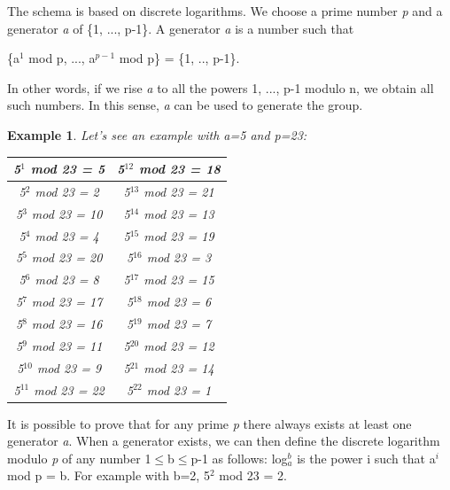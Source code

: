\documentclass[a4paper, 12pt]{report}
\newtheorem{example}{\textbf{Example}}
\begin{document}
The schema is based on discrete logarithms. We choose a prime number \textit{p} and a generator \textit{a} of \{1, ..., p-1\}. A generator \textit{a} is a number such that
\begin{center}
	\{a$^1$ mod p, ..., a$^{p-1}$ mod p\} = \{1, .., p-1\}.
\end{center} 
In other words, if we rise \textit{a} to all the powers 1, ..., p-1 modulo n, we obtain all such numbers. In this sense, \textit{a} can be used to generate the group.
\begin{example}
	Let's see an example with a=5 and p=23:
	\begin{table}[H]
		\centering
		\begin{tabular}{|c|c|}
			\hline
			5$^1$ mod 23 = 5 & 5$^{12}$ mod 23 = 18\\ \hline
			5$^2$ mod 23 = 2 & 5$^{13}$ mod 23 = 21\\ \hline
			5$^3$ mod 23 = 10 & 5$^{14}$ mod 23 = 13\\ \hline
			5$^4$ mod 23 = 4 & 5$^{15}$ mod 23 = 19\\ \hline
			5$^5$ mod 23 = 20 & 5$^{16}$ mod 23 = 3\\ \hline
			5$^6$ mod 23 = 8 & 5$^{17}$ mod 23 = 15\\ \hline
			5$^7$ mod 23 = 17 & 5$^{18}$ mod 23 = 6\\ \hline
			5$^8$ mod 23 = 16 & 5$^{19}$ mod 23 = 7\\ \hline
			5$^9$ mod 23 = 11 & 5$^{20}$ mod 23 = 12\\ \hline
			5$^{10}$ mod 23 = 9 & 5$^{21}$ mod 23 = 14\\ \hline
			5$^{11}$ mod 23 = 22 & 5$^{22}$ mod 23 = 1\\ \hline
		\end{tabular}
	\end{table}
\end{example}

It is possible to prove that for any prime \textit{p} there always exists at least one generator \textit{a}. When a generator exists, we can then define the discrete logarithm modulo \textit{p} of any number 1$\le$b$\le$p-1 as follows: log$_a^b$ is the power i such that a$^i$ mod p = b. For example with b=2, 5$^2$ mod 23 = 2.
\end{document}
